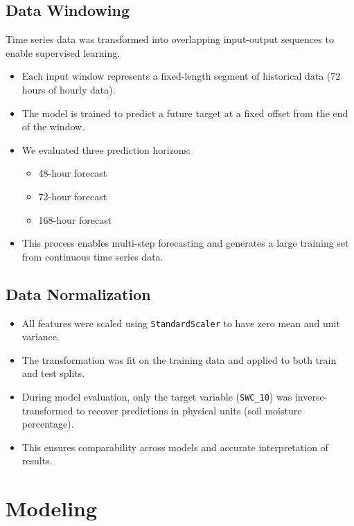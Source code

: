 \documentclass{article}
\begin{document}
\subsection{Data Windowing}

Time series data was transformed into overlapping input-output sequences to enable supervised learning.

\begin{itemize}
    \item Each input window represents a fixed-length segment of historical data (72 hours of hourly data).
    \item The model is trained to predict a future target at a fixed offset from the end of the window.
    \item We evaluated three prediction horizons:
    \begin{itemize}
        \item 48-hour forecast
        \item 72-hour forecast
        \item 168-hour forecast
    \end{itemize}
    \item This process enables multi-step forecasting and generates a large training set from continuous time series data.
\end{itemize}

\subsection{Data Normalization}

\begin{itemize}
    \item All features were scaled using \texttt{StandardScaler} to have zero mean and unit variance.
    \item The transformation was fit on the training data and applied to both train and test splits.
    \item During model evaluation, only the target variable (\texttt{SWC\_10}) was inverse-transformed to recover predictions in physical units (soil moisture percentage).
    \item This ensures comparability across models and accurate interpretation of results.
\end{itemize}


\section{Modeling}
\end{document}
